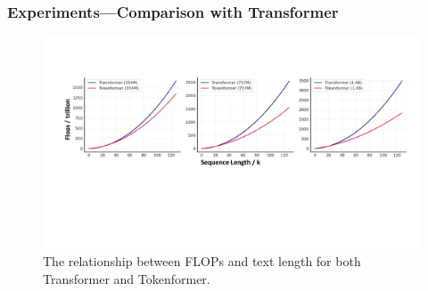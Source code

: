\begin{frame}
\frametitle{Experiments---Comparison with Transformer}
\begin{figure}[h]
  \centering
  \includegraphics[width=\linewidth]{./transformer-paper/flops_figure.pdf}
  \caption{The relationship between FLOPs and text length for both Transformer and Tokenformer.}
    \label{fig:flops_figure}
\end{figure}
\end{frame}

